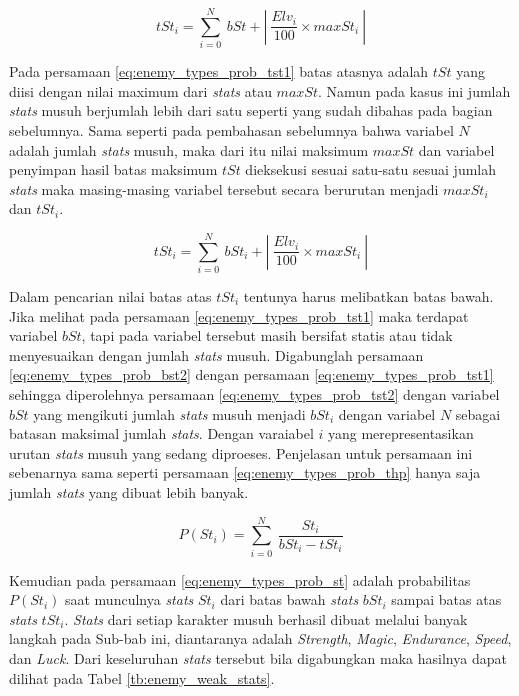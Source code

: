 \begin{equation}\label{eq:enemy_types_prob_tst1}
tSt_{i} = \sum_{i=0}^{N}\ bSt + \left |\ \frac{Elv_{i}}{100} \times maxSt_{i}\ \right |
\end{equation}

Pada persamaan \ref{eq:enemy_types_prob_tst1} batas atasnya adalah $tSt$ yang diisi dengan nilai maximum dari \textit{stats} atau $maxSt$. Namun pada kasus ini jumlah \textit{stats} musuh berjumlah lebih dari satu seperti yang sudah dibahas pada bagian sebelumnya. Sama seperti pada pembahasan sebelumnya bahwa variabel $N$ adalah jumlah \textit{stats} musuh, maka dari itu nilai maksimum $maxSt$ dan variabel penyimpan hasil batas maksimum $tSt$ dieksekusi sesuai satu-satu sesuai jumlah \textit{stats} maka masing-masing variabel tersebut secara berurutan menjadi $maxSt_{i}$ dan $tSt_{i}$.

\begin{equation}\label{eq:enemy_types_prob_tst2}
tSt_{i} = \sum_{i=0}^{N}\ bSt_{i} + \left |\ \frac{Elv_{i}}{100} \times maxSt_{i}\ \right |
\end{equation}

Dalam pencarian nilai batas atas $tSt_{i}$ tentunya harus melibatkan batas bawah. Jika melihat pada persamaan \ref{eq:enemy_types_prob_tst1} maka terdapat variabel $bSt$, tapi pada variabel tersebut masih bersifat statis atau tidak menyesuaikan dengan jumlah \textit{stats} musuh. Digabunglah persamaan \ref{eq:enemy_types_prob_bst2} dengan persamaan \ref{eq:enemy_types_prob_tst1} sehingga diperolehnya persamaan \ref{eq:enemy_types_prob_tst2} dengan variabel $bSt$ yang mengikuti jumlah \textit{stats} musuh menjadi $bSt_{i}$ dengan variabel $N$ sebagai batasan maksimal jumlah \textit{stats}. Dengan varaiabel $i$ yang merepresentasikan urutan \textit{stats} musuh yang sedang diproeses. Penjelasan untuk persamaan ini sebenarnya sama seperti persamaan \ref{eq:enemy_types_prob_thp} hanya saja jumlah \textit{stats} yang dibuat lebih banyak.

\begin{equation}\label{eq:enemy_types_prob_st}
P(St_{i}) = \sum_{i=0}^{N}\ \frac{St_{i}}{bSt_{i} - tSt_{i}}
\end{equation}

Kemudian pada persamaan \ref{eq:enemy_types_prob_st} adalah probabilitas $P(St_{i})$ saat munculnya \textit{stats} $St_{i}$ dari batas bawah \textit{stats} $bSt_{i}$ sampai batas atas \textit{stats} $tSt_{i}$. \textit{Stats} dari setiap karakter musuh berhasil dibuat melalui banyak langkah pada Sub-bab ini, diantaranya adalah \textit{Strength}, \textit{Magic}, \textit{Endurance}, \textit{Speed}, dan \textit{Luck}. Dari keseluruhan \textit{stats} tersebut bila digabungkan maka hasilnya dapat dilihat pada Tabel \ref{tb:enemy_weak_stats}.
\vspace{-2ex}

